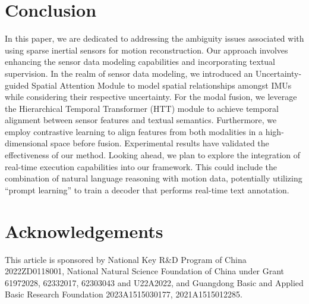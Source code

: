 \documentclass[letterpaper]{article} %
\begin{document}
\section{Conclusion}
In this paper, we are dedicated to addressing the ambiguity issues associated with using sparse inertial sensors for motion reconstruction.
Our approach involves enhancing the sensor data modeling capabilities and incorporating textual supervision. In the realm of sensor data modeling, we introduced an Uncertainty-guided Spatial Attention Module to model spatial relationships amongst IMUs while considering their respective uncertainty. For the modal fusion, we leverage the Hierarchical Temporal Transformer (HTT) module to achieve temporal alignment between sensor features and textual semantics. Furthermore, we employ contrastive learning to align features from both modalities in a high-dimensional space before fusion.
Experimental results have validated the effectiveness of our method. 
Looking ahead, we plan to explore the integration of real-time execution capabilities into our framework. This could include the combination of natural language reasoning with motion data, potentially utilizing ``prompt learning'' to train a decoder that performs real-time text annotation.

\section{Acknowledgements}
This article is sponsored by National Key R\&D Program of China 2022ZD0118001, National Natural Science Foundation
of China under Grant 61972028, 62332017, 62303043 and U22A2022, and Guangdong Basic and Applied Basic Research Foundation
2023A1515030177, 2021A1515012285.


\end{document}
